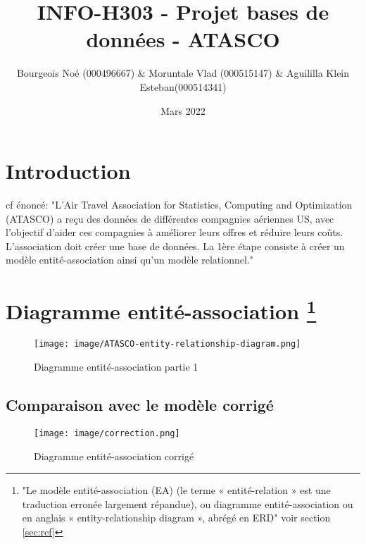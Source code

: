 \documentclass[french, utf8]{article}
\title{INFO-H303 - Projet bases de données - ATASCO}
\author{Bourgeois Noé (000496667) & Moruntale Vlad (000515147) & Aguililla Klein Esteban(000514341) }
\date{Mars 2022}
\newcommand*{\MyIncludeGraphicsMaxSize}[2][]{%
\begin{adjustbox}{max size={\textwidth}{\textheight}}
    \texttt{[image: \#2]}%
\end{adjustbox}
}
\begin{document}

\maketitle

\tableofcontents

\newpage

\section{Introduction}
cf énoncé:
"L’Air Travel Association for Statistics, Computing and Optimization (ATASCO) a reçu des données de différentes compagnies aériennes US, avec l’objectif d’aider ces compagnies à améliorer leurs offres et réduire leurs coûts.
L’association doit créer une base de données. La 1ère étape consiste à créer un modèle entité-association ainsi qu’un modèle relationnel."


\section[Diagramme entité-association]{Diagramme entité-association \footnote{"Le modèle entité-association (EA) (le terme « entité-relation » est une traduction erronée largement répandue), ou diagramme entité-association ou en anglais « entity-relationship diagram », abrégé en ERD" voir section \ref{sec:ref}}}

\begin{figure}[h]
    \centering
    \texttt{[image: image/ATASCO-entity-relationship-diagram.png]}
    \caption{Diagramme entité-association partie 1}
    \label{fig:diag_p1}
\end{figure}


\newpage
\subsection{Comparaison avec le modèle corrigé}
\begin{figure}[h]
    \centering
    \texttt{[image: image/correction.png]}
    \caption{Diagramme entité-association corrigé}
    \label{fig:diag_correction}
\end{figure}
\end{document}
